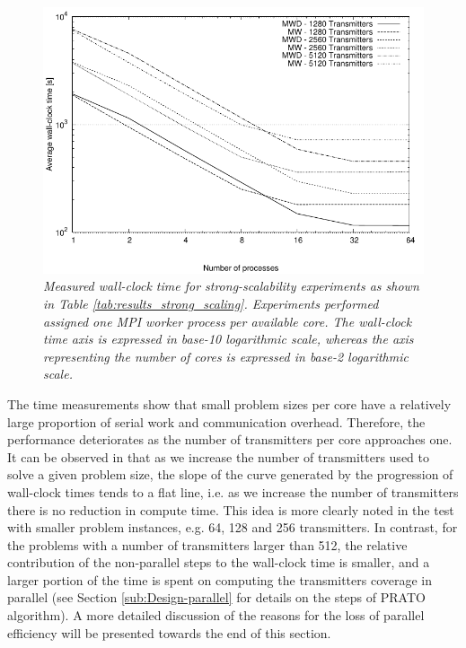 \begin{figure}
\centering

\includegraphics[width=1\columnwidth]{04-framework_design_and_implementation/img/strong_scaling-time_plot}

\caption{\textit{\emph{Measured wall-clock time for strong-scalability experiments
as shown in Table \ref{tab:results_strong_scaling}. Experiments performed
assigned one MPI worker process per available core. The wall-clock
time axis is expressed in base-10 logarithmic scale, whereas the axis
representing the number of cores is expressed in base-2 logarithmic
scale.\label{fig:strong_scalability_time}}}}
\end{figure}


The time measurements show that small problem sizes per core have
a relatively large proportion of serial work and communication overhead.
Therefore, the performance deteriorates as the number of transmitters
per core approaches one. It can be observed in 
that as we increase the number of transmitters used to solve a given
problem size, the slope of the curve generated by the progression
of wall-clock times tends to a flat line, i.e. as we increase the
number of transmitters there is no reduction in compute time. This
idea is more clearly noted in the test with smaller problem instances,
e.g. 64, 128 and 256 transmitters. In contrast, for the problems with
a number of transmitters larger than 512, the relative contribution
of the non-parallel steps to the wall-clock time is smaller, and a
larger portion of the time is spent on computing the transmitters
coverage in parallel (see Section \ref{sub:Design-parallel} for details
on the steps of PRATO algorithm). A more detailed discussion of the
reasons for the loss of parallel efficiency will be presented towards
the end of this section.

